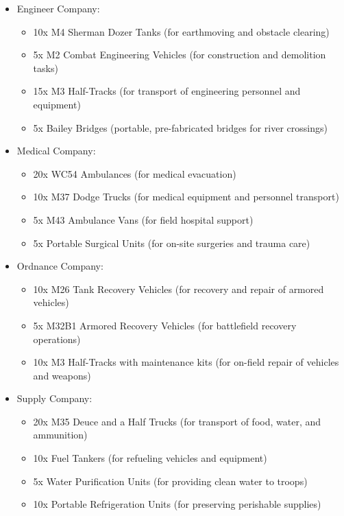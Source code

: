 \documentclass[a4paper,12pt]{article}
\begin{document}
{\begin{itemize}
\begin{itemize}
\begin{itemize}
				\end{itemize}
				\item Engineer Company:
				\begin{itemize}
					\item 10x M4 Sherman Dozer Tanks (for earthmoving and obstacle clearing)
					\item 5x M2 Combat Engineering Vehicles (for construction and demolition tasks)
					\item 15x M3 Half-Tracks (for transport of engineering personnel and equipment)
					\item 5x Bailey Bridges (portable, pre-fabricated bridges for river crossings)
				\end{itemize}
				\item Medical Company:
				\begin{itemize}
					\item 20x WC54 Ambulances (for medical evacuation)
					\item 10x M37 Dodge Trucks (for medical equipment and personnel transport)
					\item 5x M43 Ambulance Vans (for field hospital support)
					\item 5x Portable Surgical Units (for on-site surgeries and trauma care)
				\end{itemize}
				\item Ordnance Company:
				\begin{itemize}
					\item 10x M26 Tank Recovery Vehicles (for recovery and repair of armored vehicles)
					\item 5x M32B1 Armored Recovery Vehicles (for battlefield recovery operations)
					\item 10x M3 Half-Tracks with maintenance kits (for on-field repair of vehicles and weapons)
				\end{itemize}
				\item Supply Company:
				\begin{itemize}
					\item 20x M35 Deuce and a Half Trucks (for transport of food, water, and ammunition)
					\item 10x Fuel Tankers (for refueling vehicles and equipment)
					\item 5x Water Purification Units (for providing clean water to troops)
					\item 10x Portable Refrigeration Units (for preserving perishable supplies)
				\end{itemize}
			\end{itemize}
	\end{itemize}

}
\end{document}
